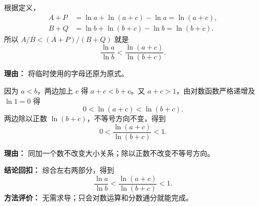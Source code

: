 \begin{proofbox}
\begin{description}[style=nextline, leftmargin=2.8em, labelsep=0.5em, itemsep=0.55em]
\item[\textbf{步骤6（代回原式）：}] 根据定义，
\begin{align*}
A+P&=\ln a+\ln(a+c)-\ln a=\ln(a+c),\\
B+Q&=\ln b+\ln(b+c)-\ln b=\ln(b+c).
\end{align*}
所以 $A/B<(A+P)/(B+Q)$ 就是
\[\frac{\ln a}{\ln b}<\frac{\ln(a+c)}{\ln(b+c)}.\]
\par\textbf{理由：} 将临时使用的字母还原为原式。
\item[\textbf{步骤7（证明右侧小于1）：}] 因为 $a<b$，两边加上 $c$ 得 $a+c<b+c$。又 $a+c>1$，由对数函数严格递增及 $\ln1=0$ 得
\[0<\ln(a+c)<\ln(b+c).\]
两边除以正数 $\ln(b+c)$，不等号方向不变，得到
\[0<\frac{\ln(a+c)}{\ln(b+c)}<1.\]
\par\textbf{理由：} 同加一个数不改变大小关系；除以正数不改变不等号方向。
\end{description}
\medskip
\textbf{结论回扣：} 综合左右两部分，得到
\[
\boxed{\frac{\ln a}{\ln b}<\frac{\ln(a+c)}{\ln(b+c)}<1}.
\]
\textbf{方法评价：} 无需求导；只会对数运算和分数通分就能完成。\end{proofbox}

